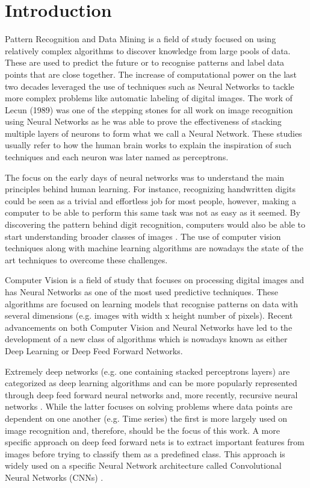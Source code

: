 \chapter{Introduction}
Pattern Recognition and Data Mining is a field of study focused on using relatively complex algorithms to discover knowledge from large pools of data. These are used to predict the future or to recognise patterns and label data points that are close together. The increase of computational power on the last two decades leveraged the use of techniques such as Neural Networks \cite{bishop1995neural} to tackle more complex problems like automatic labeling of digital images. The work of Lecun (1989) \cite{lecunn89} was one of the stepping stones for all work on image recognition using Neural Networks as he was able to prove the effectiveness of stacking multiple layers of neurons to form what we call a Neural Network. These studies usually refer to how the human brain works to explain the inspiration of such techniques and each neuron was later named as perceptrons.

The focus on the early days of neural networks was to understand the main principles behind human learning. For instance, recognizing handwritten digits could be seen as a trivial and effortless job for most people, however, making a computer to be able to perform this same task was not as easy as it seemed. By discovering the pattern behind digit recognition, computers would also be able to start understanding broader classes of images \cite{krizhevsky2012}. The use of computer vision techniques along with machine learning algorithms are nowadays the state of the art techniques to overcome these challenges.

Computer Vision is a field of study that focuses on processing digital images and has Neural Networks as one of the most used predictive techniques. These algorithms are focused on learning models that recognise patterns on data with several dimensions (e.g. images with width x height number of pixels). Recent advancements on both Computer Vision and Neural Networks have led to the development of a new class of algorithms which is nowadays known as either Deep Learning or Deep Feed Forward Networks.

Extremely deep networks (e.g. one containing stacked perceptrons layers) are categorized as deep learning algorithms and can be more popularly represented through deep feed forward neural networks \cite{hornik1989multilayer} and, more recently, recursive neural networks \cite{goller1996learning}. While the latter focuses on solving problems where data points are dependent on one another (e.g. Time series) the first is more largely used on image recognition and, therefore, should be the focus of this work. A more specific approach on deep feed forward nets is to extract important features from images before trying to classify them as a predefined class. This approach is widely used on a specific Neural Network architecture called Convolutional Neural Networks (CNNs) \cite{matsugu2003subject}.


